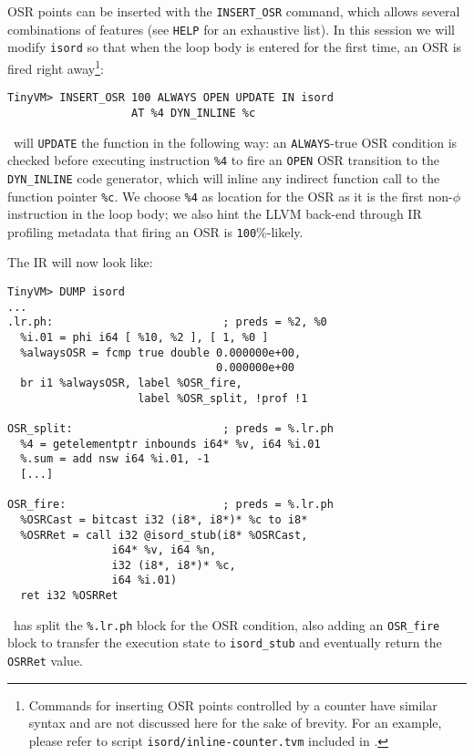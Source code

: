 OSR points can be inserted with the {\tt INSERT\_OSR} command, which allows several combinations of features (see {\tt HELP} for an exhaustive list). In this session we will modify {\tt isord} so that when the loop body is entered for the first time, an OSR is fired right away\footnote{Commands for inserting OSR points controlled by a counter have similar syntax and are not discussed here for the sake of brevity. For an example, please refer to script {\tt isord/inline-counter.tvm} included in \tinyvm.}:

\begin{small}
\begin{verbatim}
TinyVM> INSERT_OSR 100 ALWAYS OPEN UPDATE IN isord
                   AT %4 DYN_INLINE %c
\end{verbatim}
\end{small}

\noindent \tinyvm\ will {\tt UPDATE} the function in the following way: an {\tt ALWAYS}-true OSR condition is checked before executing instruction {\tt \%4} to fire an {\tt OPEN} OSR transition to the {\tt DYN\_INLINE} code generator, which will inline any indirect function call to the function pointer {\tt \%c}. We choose {\tt \%4} as location for the OSR as it is the first non-$\phi$ instruction in the loop body; we also hint the LLVM back-end through IR profiling metadata that firing an OSR is {\tt 100}\%-likely.

The IR will now look like:

\begin{small}
\begin{verbatim}
TinyVM> DUMP isord
...
.lr.ph:                          ; preds = %2, %0
  %i.01 = phi i64 [ %10, %2 ], [ 1, %0 ]
  %alwaysOSR = fcmp true double 0.000000e+00,
                                0.000000e+00
  br i1 %alwaysOSR, label %OSR_fire,
                    label %OSR_split, !prof !1

OSR_split:                       ; preds = %.lr.ph
  %4 = getelementptr inbounds i64* %v, i64 %i.01
  %.sum = add nsw i64 %i.01, -1
  [...]

OSR_fire:                        ; preds = %.lr.ph
  %OSRCast = bitcast i32 (i8*, i8*)* %c to i8*
  %OSRRet = call i32 @isord_stub(i8* %OSRCast,
                i64* %v, i64 %n,
                i32 (i8*, i8*)* %c,
                i64 %i.01)
  ret i32 %OSRRet
\end{verbatim}
\end{small}

\noindent\osrkit\ has split the {\tt \%.lr.ph} block for the OSR condition, also adding an {\tt OSR\_fire} block to transfer the execution state to {\tt isord\_stub} and eventually return the {\tt OSRRet} value. 


